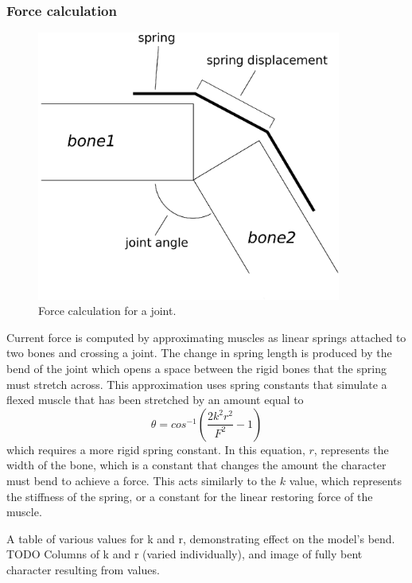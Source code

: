 \subsubsection{Force calculation}
\begin{figure}[ht]
	\centering
	\includegraphics[width=10cm]{images/spring_calc/spring_angle_calc.eps}
	\caption[Diagram of joint force calculation]{Force calculation for a joint.}
	\label{fig:forceCalc}
\end{figure}
Current force is computed by approximating muscles as linear springs attached to two bones and crossing a joint.  The change in spring length is produced by the bend of the joint which opens a space between the rigid bones that the spring must stretch across.  This approximation uses spring constants that simulate a flexed muscle that has been stretched by an amount equal to \[\theta = cos^{-1} \left( \dfrac{2 k^2 r^2}{F^2} - 1 \right)\] which requires a more rigid spring constant.  In this equation, $r$, represents the width of the bone, which is a constant that changes the amount the character must bend to achieve a force.  This acts similarly to the $k$ value, which represents the stiffness of the spring, or a constant for the linear restoring force of the muscle.  
\begin{table}[ht]
	\centering
	\caption[Table of spring muscle constants]{A table of various values for k and r, demonstrating effect on the model's bend.  TODO Columns of k and r (varied individually), and image of fully bent character resulting from values.}
	\label{tab:variedSpringValues}
\end{table}

